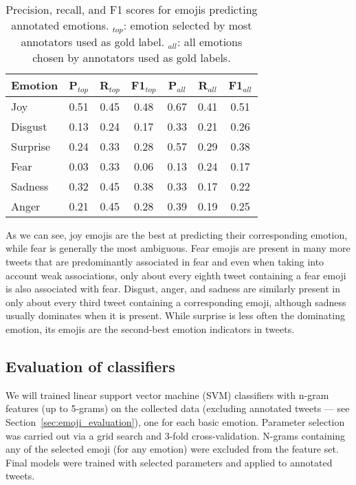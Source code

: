 \documentclass[10pt, a4paper]{article}
\begin{document}
\begin{table}[!ht]
\centering
\begin{tabular}{l | c | c | c | c | c | c}
\textbf{Emotion} & \textbf{P$_{top}$} & \textbf{R$_{top}$} & \textbf{F1$_{top}$} & \textbf{P$_{all}$} & \textbf{R$_{all}$} & \textbf{F1$_{all}$} \\\hline
Joy & 0.51 & 0.45 & 0.48 & 0.67 & 0.41 & 0.51 \\
Disgust & 0.13 & 0.24 & 0.17 & 0.33 & 0.21 & 0.26 \\
Surprise & 0.24 & 0.33 & 0.28 & 0.57 & 0.29 & 0.38 \\
Fear & 0.03 & 0.33 & 0.06 & 0.13 & 0.24 & 0.17 \\
Sadness & 0.32 & 0.45 & 0.38 & 0.33 & 0.17 & 0.22 \\
Anger & 0.21 & 0.45 & 0.28 & 0.39 & 0.19 & 0.25
\end{tabular}
\caption{Precision, recall, and F1 scores for emojis predicting annotated emotions. $_{top}$: emotion selected by most annotators used as gold label. $_{all}$: all emotions chosen by annotators used as gold labels.}
\label{tab:precision_emojis}
\end{table}

As we can see, joy emojis are the best at predicting their corresponding emotion, while fear is generally the most ambiguous. Fear emojis are present in many more tweets that are predominantly associated in fear and even when taking into account weak associations, only about every eighth tweet containing a fear emoji is also associated with fear. Disgust, anger, and sadness are similarly present in only about every third tweet containing a corresponding emoji, although sadness usually dominates when it is present. While surprise is less often the dominating emotion, its emojis are the second-best emotion indicators in tweets.

\subsection{Evaluation of classifiers}
\label{sec:classifier_evaluation}
We will trained linear support vector machine (SVM) classifiers with n-gram features (up to 5-grams) on the collected data (excluding annotated tweets --- see Section~\ref{sec:emoji_evaluation}), one for each basic emotion. 
Parameter selection was carried out via a grid search and 3-fold cross-validation.
N-grams containing any of the selected emoji (for any emotion) were excluded from the feature set.
Final models were trained with selected parameters and applied to annotated tweets. 
\end{document}
